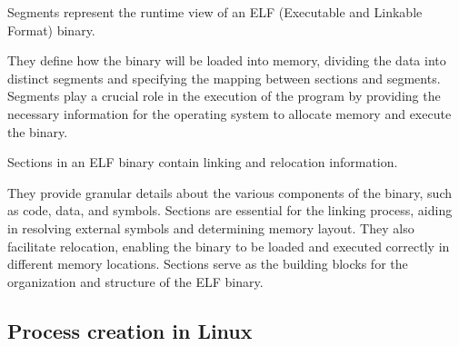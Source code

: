 \begin{definition}
    Segments represent the runtime view of an ELF (Executable and Linkable Format) binary. 
\end{definition}
They define how the binary will be loaded into memory, dividing the data into distinct segments and specifying the mapping between sections and segments. 
Segments play a crucial role in the execution of the program by providing the necessary information for the operating system to allocate memory and execute the binary.
\begin{definition}
    Sections in an ELF binary contain linking and relocation information.
\end{definition}
They provide granular details about the various components of the binary, such as code, data, and symbols. 
Sections are essential for the linking process, aiding in resolving external symbols and determining memory layout. 
They also facilitate relocation, enabling the binary to be loaded and executed correctly in different memory locations. 
Sections serve as the building blocks for the organization and structure of the ELF binary.

\subsection{Process creation in Linux}
